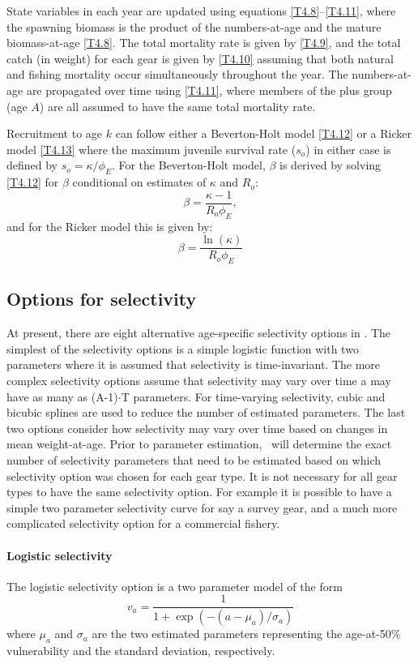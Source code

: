 State variables in each year are updated using equations \ref{T4.8}--\ref{T4.11}, where the spawning biomass is the product of the numbers-at-age and the mature biomass-at-age \eqref{T4.8}.  The total mortality rate is given by \eqref{T4.9}, and the total catch (in weight) for each gear is given by \eqref{T4.10} assuming that both natural and fishing mortality occur simultaneously throughout the year.  The numbers-at-age are propagated over time using \eqref{T4.11}, where members of the plus group (age $A$) are all assumed to have the same total mortality rate.  

Recruitment to age $k$ can follow either a Beverton-Holt model \eqref{T4.12} or a Ricker model \eqref{T4.13} where the maximum juvenile survival rate ($s_o$) in either case is defined by $s_o=\kappa/\phi_E$.  For the Beverton-Holt model, $\beta$ is derived by solving \eqref{T4.12} for $\beta$ conditional on estimates of $\kappa$ and $R_o$:
\[
\beta = \frac{\kappa-1}{R_o \phi_E},
\]
and for the Ricker model this is given by:
\[
\beta = \frac{\ln(\kappa)}{R_o \phi_E}
\]


		
\subsection{Options for selectivity}\label{Appendix:SelectivityOptions}
		
At present, there are eight alternative age-specific selectivity options in \iscam.  The simplest of the selectivity options is a simple logistic function with two parameters where it is assumed that selectivity is time-invariant.  The more complex selectivity options assume that selectivity may vary over time a may have as many as (A-1)$\cdot$T parameters.  For time-varying selectivity, cubic and bicubic splines are used to reduce the number of estimated parameters. The last two options consider how selectivity may vary over time based on changes in mean weight-at-age. Prior to parameter estimation, \iscam\ will determine the exact number of selectivity parameters that need to be estimated based on which selectivity option was chosen for each gear type.  It is not necessary for all gear types to have the same selectivity option.  For example it is possible to have a simple two parameter selectivity curve for say a survey gear, and a much more complicated selectivity option for a commercial fishery.

\paragraph{Logistic selectivity} 
The logistic selectivity option is a two parameter model of the form
\[
v_a = \frac{1}{1+ \exp{(-(a-\mu_{a})/\sigma_a)}}
\]
where $\mu_a$ and $\sigma_a$ are the two estimated parameters representing the age-at-50\% vulnerability and the standard deviation, respectively.

